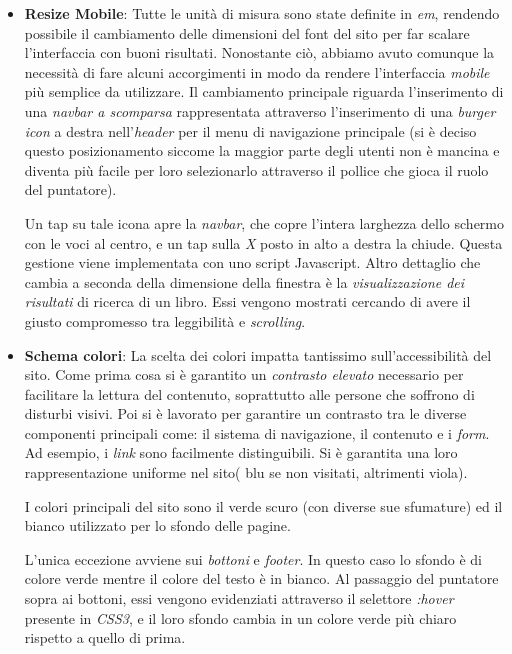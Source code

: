 \begin{itemize}
	\item \textbf{Resize Mobile}: Tutte le unità di misura sono state definite in \textit{em}, rendendo possibile il cambiamento delle dimensioni del font del sito per far scalare l’interfaccia con buoni risultati. Nonostante ciò, abbiamo avuto comunque la necessità di fare alcuni accorgimenti in modo da rendere l'interfaccia \textit{mobile} più semplice da utilizzare. Il cambiamento principale riguarda l’inserimento di una \textit{navbar a scomparsa} rappresentata attraverso l’inserimento di una \textit{burger icon} a destra nell’\textit{header} per il menu di navigazione principale (si è deciso questo posizionamento siccome la maggior parte degli utenti non è mancina e diventa più facile per loro selezionarlo attraverso il pollice che gioca il ruolo del puntatore).
	
		Un tap su tale icona apre la \textit{navbar}, che copre l’intera larghezza dello schermo con le voci al centro, e un tap sulla \textit{X} posto in alto a destra la chiude. Questa gestione viene implementata con uno script Javascript. Altro dettaglio che cambia a seconda della dimensione della finestra è la \textit{visualizzazione dei risultati} di ricerca di un libro. Essi vengono mostrati cercando di avere il giusto compromesso tra leggibilità e \textit{scrolling}.
		
	\item \textbf{Schema colori}: La scelta dei colori impatta tantissimo sull'accessibilità del sito. Come prima cosa si è garantito un \textit{contrasto elevato} necessario per facilitare la lettura del contenuto, soprattutto alle persone che soffrono di disturbi visivi. Poi si è lavorato per garantire un contrasto tra le diverse componenti principali come: il sistema di navigazione, il contenuto e i \textit{form}. Ad esempio, i \textit{link} sono facilmente distinguibili. Si è garantita una loro rappresentazione uniforme nel sito( blu se non visitati, altrimenti viola).
		
		I colori principali del sito sono il verde scuro (con diverse sue sfumature) ed il bianco utilizzato per lo sfondo delle pagine.
		
		L’unica eccezione avviene sui \textit{bottoni} e \textit{footer}. In questo caso lo sfondo è di colore verde mentre il colore del testo è in bianco. Al passaggio del puntatore sopra ai bottoni, essi vengono evidenziati attraverso il selettore \textit{:hover} presente in \textit{CSS3}, e il loro sfondo cambia in un colore verde più chiaro rispetto a quello di prima.
		

\end{itemize}
